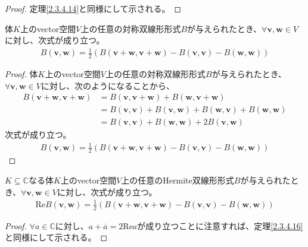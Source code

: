 \documentclass[dvipdfmx]{jsarticle}
\begin{document}
\begin{proof} 定理\ref{2.3.4.14}と同様にして示される。
\end{proof}
\begin{thm}\label{2.3.4.16}
体$K$上のvector空間$V$上の任意の対称双線形形式$B$が与えられたとき、$\forall\mathbf{v},\mathbf{w} \in V$に対し、次式が成り立つ。
\begin{align*}
B\left( \mathbf{v},\mathbf{w} \right) = \frac{1}{2}\left( B\left( \mathbf{v} + \mathbf{w},\mathbf{v} + \mathbf{w} \right) - B\left( \mathbf{v},\mathbf{v} \right) - B\left( \mathbf{w},\mathbf{w} \right) \right)
\end{align*}
\end{thm}
\begin{proof}
体$K$上のvector空間$V$上の任意の対称双線形形式$B$が与えられたとき、$\forall\mathbf{v},\mathbf{w} \in V$に対し、次のようになることから、
\begin{align*}
B\left( \mathbf{v} + \mathbf{w},\mathbf{v} + \mathbf{w} \right) &= B\left( \mathbf{v},\mathbf{v} + \mathbf{w} \right) + B\left( \mathbf{w},\mathbf{v} + \mathbf{w} \right)\\
&= B\left( \mathbf{v},\mathbf{v} \right) + B\left( \mathbf{v},\mathbf{w} \right) + B\left( \mathbf{w},\mathbf{v} \right) + B\left( \mathbf{w},\mathbf{w} \right)\\
&= B\left( \mathbf{v},\mathbf{v} \right) + B\left( \mathbf{w},\mathbf{w} \right) + 2B\left( \mathbf{v},\mathbf{w} \right)
\end{align*}
次式が成り立つ。
\begin{align*}
B\left( \mathbf{v},\mathbf{w} \right) = \frac{1}{2}\left( B\left( \mathbf{v} + \mathbf{w},\mathbf{v} + \mathbf{w} \right) - B\left( \mathbf{v},\mathbf{v} \right) - B\left( \mathbf{w},\mathbf{w} \right) \right)
\end{align*}
\end{proof}
\begin{thm}\label{2.3.4.17}
$K \subseteq \mathbb{C}$なる体$K$上のvector空間$V$上の任意のHermite双線形形式$B$が与えられたとき、$\forall\mathbf{v},\mathbf{w} \in V$に対し、次式が成り立つ。
\begin{align*}
\mathrm{Re}{B\left( \mathbf{v},\mathbf{w} \right)} = \frac{1}{2}\left( B\left( \mathbf{v} + \mathbf{w},\mathbf{v} + \mathbf{w} \right) - B\left( \mathbf{v},\mathbf{v} \right) - B\left( \mathbf{w},\mathbf{w} \right) \right)
\end{align*}
\end{thm}
\begin{proof}
$\forall a \in \mathbb{C}$に対し、$a + \overline{a} = 2\mathrm{Re}a$が成り立つことに注意すれば、定理\ref{2.3.4.16}と同様にして示される。
\end{proof}
\end{document}
